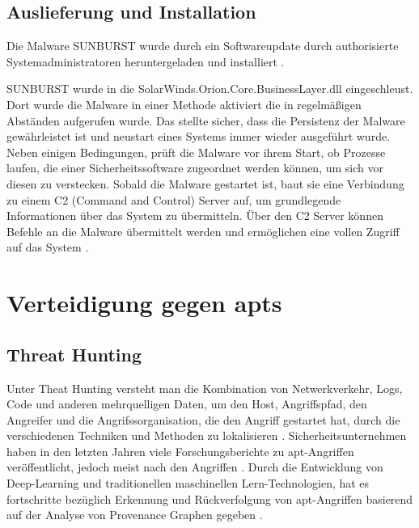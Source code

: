 \documentclass[conference]{IEEEtran}
\begin{document}
\subsection{Auslieferung und Installation}
Die Malware SUNBURST wurde durch ein Softwareupdate durch authorisierte Systemadministratoren heruntergeladen und installiert \cite{FIREEYE2020}.

SUNBURST wurde in die SolarWinds.Orion.Core.BusinessLayer.dll eingeschleust.
Dort wurde die Malware in einer Methode aktiviert die in regelmäßigen Abständen aufgerufen wurde.
Das stellte sicher, dass die Persistenz der Malware gewährleistet ist und neustart eines Systems immer wieder ausgeführt wurde.
Neben einigen Bedingungen, prüft die Malware vor ihrem Start, ob Prozesse laufen, die einer Sicherheitssoftware zugeordnet werden können, um sich vor diesen zu verstecken.
Sobald die Malware gestartet ist, baut sie eine Verbindung zu einem C2 (Command and Control) Server auf, um grundlegende Informationen über das System zu übermitteln.
Über den C2 Server können Befehle an die Malware übermittelt werden und ermöglichen eine vollen Zugriff auf das System \cite{Intelligence2020}.



\section{Verteidigung gegen \aclp{apt}}
\subsection{Threat Hunting}
Unter Theat Hunting versteht man die Kombination von Netwerkverkehr, Logs, Code und anderen mehrquelligen Daten, um den Host, Angriffspfad, den Angreifer und die Angrifssorganisation, die den Angriff gestartet hat, durch die verschiedenen Techniken und Methoden zu lokalisieren \cite{Chen2022}.
Sicherheitsunternehmen haben in den letzten Jahren viele Forschungsberichte zu \ac{apt}-Angriffen veröffentlicht, jedoch meist nach den Angriffen \cite{Chen2022}.
Durch die Entwicklung von Deep-Learning und traditionellen maschinellen Lern-Technologien, hat es fortschritte bezüglich Erkennung und Rückverfolgung von \ac{apt}-Angriffen basierend auf der Analyse von Provenance Graphen gegeben \cite{Chen2022}.
\end{document}
